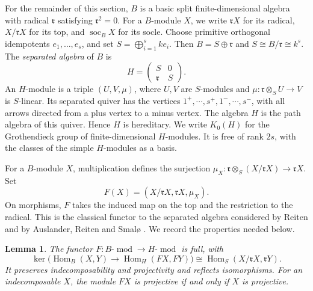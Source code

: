 \documentclass[a4paper,reqno]{amsart}
\numberwithin{equation}{section}
\newtheorem{lemma}[lemma]{Lemma}
\newcommand{\Hom}{\operatorname{Hom}}
\newcommand{\soc}{\operatorname{soc}}
\newcommand{\modu}{\operatorname{mod}}
\begin{document}
For the remainder of this section, $B$ is a basic split
finite-dimensional algebra with radical $\mathfrak r$ satisfying
$\mathfrak r^2=0$. For a $B$-module $X$, we write
$\mathfrak rX$ for its radical, $X/\mathfrak rX$ for its top, and
$\soc_BX$ for its socle. Choose primitive orthogonal idempotents
$e_1,\ldots,e_s$, and set $S=\bigoplus_{i=1}^s ke_i$. Then
$B=S\oplus\mathfrak r$ and $S\cong B/\mathfrak r\cong k^s$.
The \emph{separated algebra} of $B$ is
\[
H=\begin{pmatrix}S&0\\ \mathfrak r&S\end{pmatrix}.
\]
An $H$-module is a triple $(U,V,\mu)$, where $U,V$ are $S$-modules
and $\mu:\mathfrak r\otimes_SU\to V$ is $S$-linear. Its
separated quiver has the vertices
$1^+,\cdots,s^+,1^-,\cdots,s^-$, with all arrows directed from a plus
vertex to a minus vertex. The algebra $H$ is the path algebra of this
quiver. Hence $H$ is hereditary. We write $K_0(H)$ for the Grothendieck
group of finite-dimensional $H$-modules. It is free of rank $2s$, with
the classes of the simple $H$-modules as a basis.

For a $B$-module $X$, multiplication defines the surjection
$\mu_X:\mathfrak r\otimes_S(X/\mathfrak rX)\to\mathfrak rX$. Set
\[
 F(X)=(X/\mathfrak rX,\mathfrak rX,\mu_X).
\]
On morphisms, $F$ takes the induced map on the top and the restriction
to the radical. This is the classical functor to the separated algebra considered
by Reiten \cite{Reiten75} and by Auslander, Reiten and Smal\o{}
\cite{ARS}. We record the properties needed below.

\begin{lemma}\label{lem:F}
The functor $F:B\text{-}\modu\to H\text{-}\modu$ is full, with
\[
 \ker\bigl(\Hom_B(X,Y)\longrightarrow\Hom_H(FX,FY)\bigr)
 \cong\Hom_S(X/\mathfrak rX,\mathfrak rY).
\]
It preserves indecomposability and projectivity and reflects
isomorphisms. For an indecomposable $X$, the module $FX$ is
projective if and only if $X$ is projective.
\end{lemma}
\end{document}
